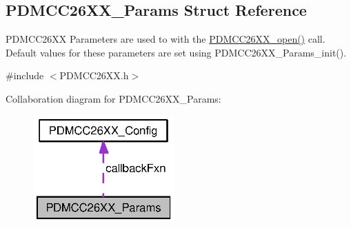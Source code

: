 \subsection{P\+D\+M\+C\+C26\+X\+X\+\_\+\+Params Struct Reference}
\label{struct_p_d_m_c_c26_x_x___params}


P\+D\+M\+C\+C26\+X\+X Parameters are used to with the \hyperlink{_p_d_m_c_c26_x_x_8h_a431d9b71e0d0eebd5ab85960f1c82ee0}{P\+D\+M\+C\+C26\+X\+X\+\_\+open()} call. Default values for these parameters are set using P\+D\+M\+C\+C26\+X\+X\+\_\+\+Params\+\_\+init().  




{\ttfamily \#include $<$P\+D\+M\+C\+C26\+X\+X.\+h$>$}



Collaboration diagram for P\+D\+M\+C\+C26\+X\+X\+\_\+\+Params\+:
\nopagebreak
\begin{figure}[H]
\begin{center}
\leavevmode
\includegraphics[width=153pt]{struct_p_d_m_c_c26_x_x___params__coll__graph}
\end{center}
\end{figure}
